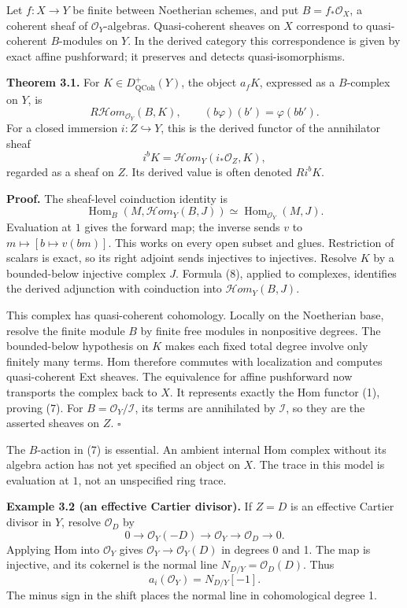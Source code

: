 \documentclass[11pt]{article}
\begin{document}
Let \(f:X\to Y\) be finite between Noetherian schemes, and put
\(B=f_*\mathcal O_X\), a coherent sheaf of \(\mathcal O_Y\)-algebras.
Quasi-coherent sheaves on \(X\) correspond to quasi-coherent
\(B\)-modules on \(Y\). In the derived category this correspondence is
given by exact affine pushforward; it preserves and detects
quasi-isomorphisms.

\textbf{Theorem 3.1.} For \(K\in D^+_{\mathrm{QCoh}}(Y)\), the object
\(a_fK\), expressed as a \(B\)-complex on \(Y\), is \[
R\mathcal H om_{\mathcal O_Y}(B,K),
\qquad (b\varphi)(b')=\varphi(bb').
\tag{7}
\] For a closed immersion \(i:Z\hookrightarrow Y\), this is the derived
functor of the annihilator sheaf \[
i^bK=\mathcal H om_Y(i_*\mathcal O_Z,K),
\] regarded as a sheaf on \(Z\). Its derived value is often denoted
\(Ri^bK\).

\textbf{Proof.} The sheaf-level coinduction identity is \[
\operatorname{Hom}_B(M,\mathcal H om_Y(B,J))
 \simeq\operatorname{Hom}_{\mathcal O_Y}(M,J).
\tag{8}
\] Evaluation at \(1\) gives the forward map; the inverse sends \(v\) to
\(m\mapsto[b\mapsto v(bm)]\). This works on every open subset and glues.
Restriction of scalars is exact, so its right adjoint sends injectives
to injectives. Resolve \(K\) by a bounded-below injective complex \(J\).
Formula (8), applied to complexes, identifies the derived adjunction
with coinduction into \(\mathcal H om_Y(B,J)\).

This complex has quasi-coherent cohomology. Locally on the Noetherian
base, resolve the finite module \(B\) by finite free modules in
nonpositive degrees. The bounded-below hypothesis on \(K\) makes each
fixed total degree involve only finitely many terms. Hom therefore
commutes with localization and computes quasi-coherent Ext sheaves. The
equivalence for affine pushforward now transports the complex back to
\(X\). It represents exactly the Hom functor (1), proving (7). For
\(B=\mathcal O_Y/\mathcal I\), its terms are annihilated by
\(\mathcal I\), so they are the asserted sheaves on \(Z\). \(\square\)

The \(B\)-action in (7) is essential. An ambient internal Hom complex
without its algebra action has not yet specified an object on \(X\). The
trace in this model is evaluation at \(1\), not an unspecified ring
trace.

\textbf{Example 3.2 (an effective Cartier divisor).} If \(Z=D\) is an
effective Cartier divisor in \(Y\), resolve \(\mathcal O_D\) by \[
0\longrightarrow\mathcal O_Y(-D)\longrightarrow\mathcal O_Y
 \longrightarrow\mathcal O_D\longrightarrow0.
\] Applying Hom into \(\mathcal O_Y\) gives
\(\mathcal O_Y\to\mathcal O_Y(D)\) in degrees 0 and 1. The map is
injective, and its cokernel is the normal line
\(N_{D/Y}=\mathcal O_D(D)\). Thus \[
a_i(\mathcal O_Y)=N_{D/Y}[-1].
\tag{9}
\] The minus sign in the shift places the normal line in cohomological
degree 1.
\end{document}
